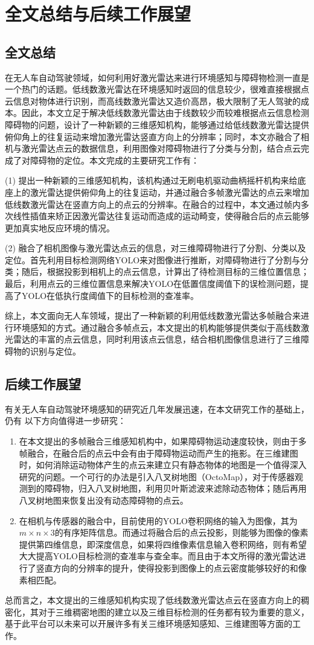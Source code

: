 
\chapter{全文总结与后续工作展望}

\section{全文总结}
在无人车自动驾驶领域，如何利用好激光雷达来进行环境感知与障碍物检测一直是一个热门的话题。低线数激光雷达在环境感知时返回的信息较少，很难直接根据点云信息对物体进行识别，而高线数激光雷达又造价高昂，极大限制了无人驾驶的成本。因此，本文立足于解决低线数激光雷达由于线数较少而较难根据点云信息检测障碍物的问题，设计了一种新颖的三维感知机构，能够通过给低线数激光雷达提供俯仰角上的往复运动来增加激光雷达竖直方向上的分辨率；同时，本文亦融合了相机与激光雷达点云的数据信息，利用图像对障碍物进行了分类与分割，结合点云完成了对障碍物的定位。本文完成的主要研究工作有：

(1) 提出一种新颖的三维感知机构，该机构通过无刷电机驱动曲柄摇杆机构来给底座上的激光雷达提供俯仰角上的往复运动，并通过融合多帧激光雷达的点云来增加低线数激光雷达在竖直方向上的点云的分辨率。在融合的过程中，本文通过帧内多次线性插值来矫正因激光雷达往复运动而造成的运动畸变，使得融合后的点云能够更加真实地反应环境的情况。
 
(2) 融合了相机图像与激光雷达点云的信息，对三维障碍物进行了分割、分类以及定位。首先利用目标检测网络YOLO来对图像进行推断，对障碍物进行了分割与分类；随后，根据投影到相机上的点云信息，计算出了待检测目标的三维位置信息；最后，利用点云的三维位置信息来解决YOLO在低置信度阈值下的误检测问题，提高了YOLO在低执行度阈值下的目标检测的查准率。

综上，本文面向无人车领域，提出了一种新颖的利用低线数激光雷达多帧融合来进行环境感知的方式。通过融合多帧点云，本文提出的机构能够提供类似于高线数激光雷达的丰富的点云信息，同时利用该点云信息，结合相机图像信息进行了三维障碍物的识别与定位。

\section{后续工作展望}
有关无人车自动驾驶环境感知的研究近几年发展迅速，在本文研究工作的基础上，仍有
以下方向值得进一步研究：
\begin{enumerate}
    \item 在本文提出的多帧融合三维感知机构中，如果障碍物运动速度较快，则由于多帧融合，在融合后的点云中会有由于障碍物运动而产生的拖影。在三维建图时，如何消除运动物体产生的点云来建立只有静态物体的地图是一个值得深入研究的问题。一个可行的办法是引入八叉树地图（OctoMap），对于传感器观测到的障碍物，归入八叉树地图，利用贝叶斯滤波来滤除动态物体；随后再用八叉树地图来恢复出没有动态障碍物的点云。
    \item 在相机与传感器的融合中，目前使用的YOLO卷积网络的输入为图像，其为$m\times n\times 3$的有序矩阵信息。而通过将融合后的点云投影，则能够为图像的像素提供第四维信息，即深度信息，如果将四维像素信息输入卷积网络，则有希望大大提高YOLO目标检测的查准率与查全率。而且由于本文所得的激光雷达进行了竖直方向的分辨率的提升，使得投影到图像上的点云密度能够较好的和像素相匹配。
\end{enumerate}

总而言之，本文提出的三维感知机构实现了低线数激光雷达点云在竖直方向上的稠密化，其对于三维稠密地图的建立以及三维目标检测的任务都有较为重要的意义，基于此平台可以未来可以开展许多有关三维环境感知感知、三维建图等方面的工作。